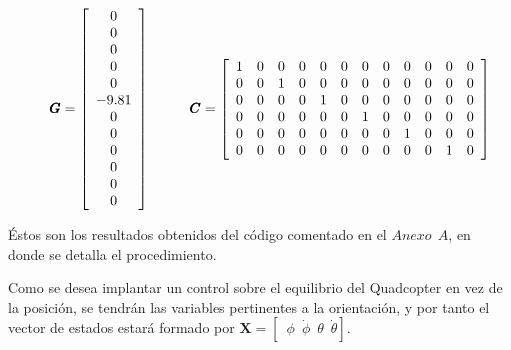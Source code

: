 \documentclass[twoside,11pt]{book}
\begin{document}
\begin{equation}
\hspace*{0.5cm} \pmb{G}= \left[ \begin{array}{c}
0 \\
0 \\
0 \\
0 \\
0 \\
-9.81 \\
0 \\
0 \\
0 \\
0 \\
0 \\
0 \\ \end{array} \right]  \hspace*{1cm} \pmb{C}=\left[ \begin{array}{cccccccccccc}
1 & 0 & 0 & 0 & 0 & 0 & 0 & 0 & 0 & 0 & 0 & 0 \\
0 & 0 & 1 & 0 & 0 & 0 & 0 & 0 & 0 & 0 & 0 & 0 \\
0 & 0 & 0 & 0 & 1 & 0 & 0 & 0 & 0 & 0 & 0 & 0 \\
0 & 0 & 0 & 0 & 0 & 0 & 1 & 0 & 0 & 0 & 0 & 0 \\
0 & 0 & 0 & 0 & 0 & 0 & 0 & 0 & 1 & 0 & 0 & 0 \\
0 & 0 & 0 & 0 & 0 & 0 & 0 & 0 & 0 & 0 & 1 & 0 \\ \end{array} \right]
\end{equation}

Éstos son los resultados obtenidos del código comentado en el $Anexo \>\>A$, en donde se detalla el procedimiento.

Como se desea implantar un control sobre el equilibrio del Quadcopter en vez de la posición, se tendrán las variables pertinentes a la orientación, y por tanto el vector de estados estará formado por %
$\pmb{X}=\left[ \enspace \phi \enspace \dot{\phi} \enspace \theta \enspace \dot{\theta} \right]$. 
\end{document}
